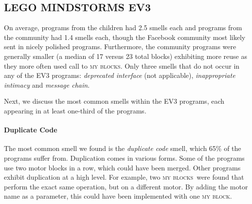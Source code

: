 \documentclass[conference]{IEEEtran}
\newcommand{\ms}{LEGO MINDSTORMS EV3}
\newcommand{\mbs}{\textsc{my blocks}}
\newcommand{\mb}{\textsc{my block}}
\begin{document}


\subsection{\ms}
On average, programs from the children had 2.5 smells each and  programs from the community  had 1.4 smells each, though  the Facebook community most likely sent in nicely polished programs. Furthermore, the community programs were generally smaller (a median of 17 versus 23 total blocks) exhibiting more reuse as they more often used call to \mbs. 
Only three smells that do not occur in any of the EV3 programs: \emph{deprecated interface} (not applicable), \emph{inappropriate intimacy} and \emph{message chain}.

Next, we discuss the  most common smells within the EV3 programs, each appearing in at least one-third of the programs. 



\paragraph{Duplicate Code}
The most common smell we found  is the \emph{duplicate code} smell, which 65\% of the programs suffer from. Duplication comes in various forms.  Some of the programs use two motor blocks in a row, which could have been merged. Other programs exhibit duplication at a high level. For example,  two \mbs~were found that perform the exact same operation, but on a different motor. By adding the motor name as a parameter, this could have been implemented with one \mb.
\end{document}
